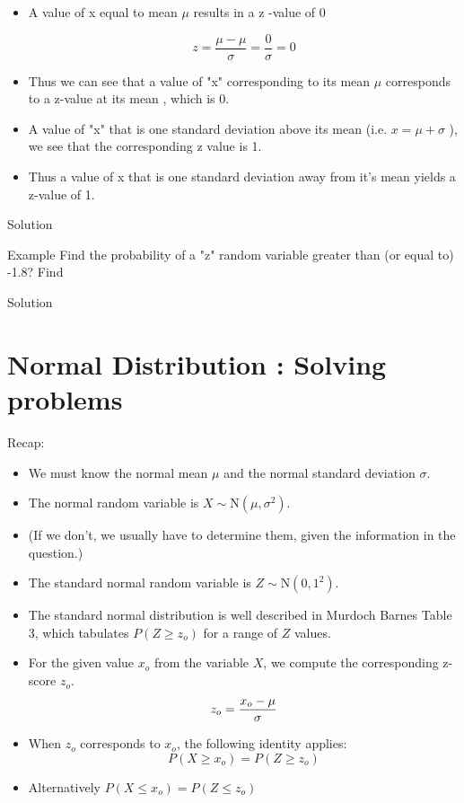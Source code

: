 \documentclass[]{report}
\begin{document}
\begin{itemize}
\item A value of x equal to mean $\mu$  results in a z -value of 0

\[ z = \frac{\mu - \mu}{\sigma} = \frac{0}{\sigma} = 0\]


\item Thus we can see that a value of "x" corresponding to its mean $\mu$ corresponds to a z-value at its mean , which is 0.

\item A value of "x" that is one standard deviation above its mean (i.e. $x=\mu +\sigma$  ), we see that the corresponding z value is 1.


\item Thus a value of x that is one standard deviation away from it's mean yields a z-value of 1.
\end{itemize}








Solution 



Example 
Find the probability of a "z" random variable greater than (or equal to) -1.8?
Find  

Solution





\section{Normal Distribution : Solving problems}
Recap:
\begin{itemize}
\item We must know the normal mean $\mu$ and the normal standard deviation $\sigma$.
\item The normal random variable is $X \sim \mbox{N} ( \mu , \sigma^2)$.\smallskip
\item (If we don't, we usually have to determine them, given the information in the question.)\smallskip
\item The standard normal random variable is $Z\sim \mbox{N} ( 0 , 1^2)$.\smallskip
\item The standard normal distribution is well described in Murdoch Barnes Table 3, which tabulates $P(Z \geq z_o)$ for a range of $Z$ values.
\end{itemize}



\begin{itemize}
\item For the given value $x_o$ from the variable $X$, we compute the corresponding z-score $z_o$.
\[ z_o = { x_o - \mu \over \sigma} \]
\item When $z_o$ corresponds to $x_o$, the following identity applies:
\[  P(X \geq x_o )= P(Z \geq z_o ) \]
\item Alternatively $ P(X \leq x_o )= P(Z \leq z_o ) $
\end{itemize}
\end{document}
